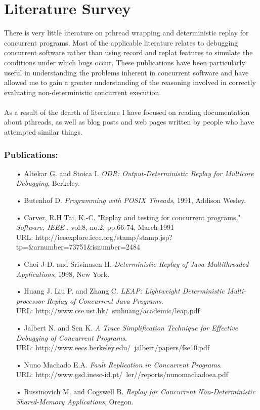 \documentclass[a4paper,11pt]{article}
\begin{document}
\clearpage
\section{Literature Survey}
There is very little literature on pthread wrapping and deterministic replay for concurrent programs. Most of the applicable literature relates to debugging concurrent software rather than using record and replat features to simulate the conditions under which bugs occur. These publications have been particularly useful in understanding the problems inherent in concurrent software and have allowed me to gain a greater understanding of the reasoning involved in correctly evaluating non-deterministic concurrent execution.
\\
\\
 As a result of the dearth of literature I have focused on reading documentation about pthreads, as well as blog posts and web pages written by people who have attempted similar things.


\subsubsection*{Publications:}
\begin{itemize}
\item[•]
Altekar G. and Stoica I. \emph{ODR: Output-Deterministic Replay for Multicore Debugging}, Berkeley.
\item[•]
Butenhof D. \emph{Programming with POSIX Threads}, 1991, Addison Wesley.
\item[•]
Carver, R.H Tai, K.-C. "Replay and testing for concurrent programs," \emph{Software, IEEE} , vol.8, no.2, pp.66-74, March 1991 \\ URL: http://ieeexplore.ieee.org/stamp/stamp.jsp?tp=\&arnumber=73751\&isnumber=2484
\item[•]
Choi J-D. and Srivinasen H. \emph{Deterministic Replay of Java Multithreaded Applications}, 1998, New York.
\item[•]
Huang J. Liu P. and Zhang C. \emph{LEAP: Lightweight Deterministic Multi-processor Replay of Concurrent Java Programs}. \\ URL: http://www.cse.ust.hk/~smhuang/academic/leap.pdf
\item[•]
Jalbert N. and Sen K. \emph{A Trace Simplification Technique for Effective Debugging of Concurrent Programs}. \\ URL: http://www.eecs.berkeley.edu/~jalbert/papers/fse10.pdf
\item[•]
Nuno Machado E.A. \emph{Fault Replication in Concurrent Programs}. \\ URL: http://www.gsd.inesc-id.pt/~ler//reports/nunomachadoea.pdf
\item[•]
Russinovich M. and Cogswell B. \emph{Replay for Concurrent Non-Deterministic Shared-Memory Applications}, Oregon.


\end{itemize}
\end{document}
